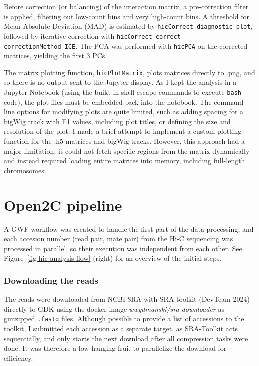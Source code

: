 \documentclass[
  11pt,
  a4paper,
]{scrbook}
\begin{document}
Before correction (or balancing) of the interaction matrix, a
pre-correction filter is applied, filtering out low-count bins and very
high-count bins. A threshold for Mean Absolute Deviation (MAD) is
estimated by \texttt{hicCorrect\ diagnostic\_plot}, followed by
iterative correction with
\texttt{hicCorrect\ correct\ -\/-correctionMethod\ ICE}. The PCA was
performed with \texttt{hicPCA} on the corrected matrices, yielding the
first 3 PCs.

The matrix plotting function, \texttt{hicPlotMatrix}, plots matrices
directly to .png, and so there is no output sent to the Jupyter display.
As I kept the analysis in a Jupyter Notebook (using the buikt-in
shell-escape commands to execute \texttt{bash} code), the plot files
must be embedded back into the notebook. The command-line options for
modifying plots are quite limited, such as adding spacing for a bigWig
track with E1 values, including plot titles, or defining the size and
resolution of the plot. I made a brief attempt to implement a custom
plotting function for the .h5 matrices and bigWig tracks. However, this
approach had a major limitation: it could not fetch specific regions
from the matrix dynamically and instead required loading entire matrices
into memory, including full-length chromosomes.

\section{Open2C pipeline}\label{open2c-pipeline}

A GWF workflow was created to handle the first part of the data
processing, and each accesion number (read pair, mate pair) from the
Hi-C sequencing was processed in parallel, so their execution was
independent from each other. See Figure~\ref{fig-hic-analysis-flow}
(right) for an overview of the initial steps.

\subsubsection{Downloading the reads}\label{downloading-the-reads}

The reads were downloaded from NCBI SRA with SRA-toolkit (DevTeam 2024)
directly to GDK using the docker image \emph{wwydmanski/sra-downloader}
as gunzipped \texttt{.fastq} files. Although possible to provide a list
of accessions to the toolkit, I submitted each accession as a separate
target, as SRA-Toolkit acts sequentially, and only starts the next
download after all compression tasks were done. It was therefore a
low-hanging fruit to parallelize the download for efficiency.
\end{document}
